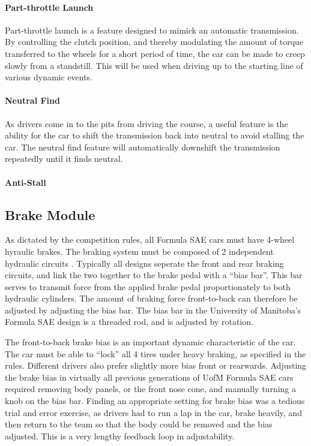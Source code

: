 \paragraph{Part-throttle Launch}
Part-throttle launch is a feature designed to mimick an automatic transmission. By controlling the clutch position, and thereby modulating the amount of torque transferred to the wheels for a short period of time, the car can be made to creep slowly from a standstill. This will be used when driving up to the starting line of various dynamic events.

\paragraph{Neutral Find}
As drivers come in to the pits from driving the course, a useful feature is the ability for the car to shift the transmission back into neutral to avoid stalling the car. The neutral find feature will automatically downshift the transmission repeatedly until it finds neutral.

\paragraph{Anti-Stall}


%
%
\subsection{Brake Module}

As dictated by the competition rules, all Formula SAE cars must have 4-wheel hyraulic brakes. The braking system must be composed of 2 independent hydraulic circuits \cite{2010fsaerules}. Typically all designs seperate the front and rear braking circuits, and link the two together to the brake pedal with a {}``bias bar''. This bar serves to transmit force from the applied brake pedal proportionately to both hydraulic cylinders. The amount of braking force front-to-back can therefore be adjusted by adjusting the bias bar. The bias bar in the University of Manitoba's Formula SAE design is a threaded rod, and is adjusted by rotation.

The front-to-back brake bias is an important dynamic characteristic of the car. The car must be able to {}``lock'' all 4 tires under heavy braking, as specified in the rules. Different drivers also prefer slightly more bias front or rearwards. Adjusting the brake bias in virtually all previous generations of UofM Formula SAE cars required removing body panels, or the front nose cone, and manually turning a knob on the bias bar. Finding an appropriate setting for brake bias was a tedious trial and error exercise, as drivers had to run a lap in the car, brake heavily, and then return to the team so that the body could be removed and the bias adjusted. This is a very lengthy feedback loop in adjustability.

